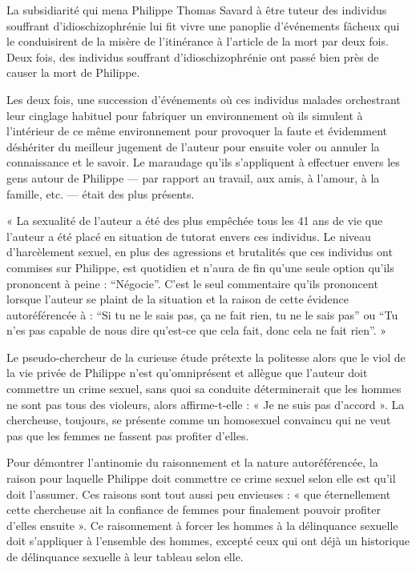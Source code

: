 \documentclass[12pt,oneside]{article}
\begin{document}
La subsidiarité qui mena Philippe Thomas Savard à être tuteur des individus souffrant d'idioschizophrénie lui fit vivre une panoplie d'événements fâcheux qui le conduisirent de la misère de l'itinérance à l'article de la mort par deux fois. Deux fois, des individus souffrant d'idioschizophrénie ont passé bien près de causer la mort de Philippe.

Les deux fois, une succession d'événements où ces individus malades orchestrant leur cinglage habituel pour fabriquer un environnement où ils simulent à l'intérieur de ce même environnement pour provoquer la faute et évidemment déshériter du meilleur jugement de l'auteur pour ensuite voler ou annuler la connaissance et le savoir. Le maraudage qu'ils s'appliquent à effectuer envers les gens autour de Philippe --- par rapport au travail, aux amis, à l'amour, à la famille, etc. --- était des plus présents.

« La sexualité de l'auteur a été des plus empêchée tous les 41 ans de vie que l'auteur a été placé en situation de tutorat envers ces individus. Le niveau d'harcèlement sexuel, en plus des agressions et brutalités que ces individus ont commises sur Philippe, est quotidien et n'aura de fin qu'une seule option qu'ils prononcent à peine : ``Négocie''. C'est le seul commentaire qu'ils prononcent lorsque l'auteur se plaint de la situation et la raison de cette évidence autoréférencée à : ``Si tu ne le sais pas, ça ne fait rien, tu ne le sais pas'' ou ``Tu n'es pas capable de nous dire qu'est-ce que cela fait, donc cela ne fait rien''. »

Le pseudo-chercheur de la curieuse étude prétexte la politesse alors que le viol de la vie privée de Philippe n'est qu'omniprésent et allègue que l'auteur doit commettre un crime sexuel, sans quoi sa conduite déterminerait que les hommes ne sont pas tous des violeurs, alors affirme-t-elle : « Je ne suis pas d'accord ». La chercheuse, toujours, se présente comme un homosexuel convaincu qui ne veut pas que les femmes ne fassent pas profiter d'elles.

Pour démontrer l'antinomie du raisonnement et la nature autoréférencée, la raison pour laquelle Philippe doit commettre ce crime sexuel selon elle est qu'il doit l'assumer. Ces raisons sont tout aussi peu envieuses : « que éternellement cette chercheuse ait la confiance de femmes pour finalement pouvoir profiter d'elles ensuite ». Ce raisonnement à forcer les hommes à la délinquance sexuelle doit s'appliquer à l'ensemble des hommes, excepté ceux qui ont déjà un historique de délinquance sexuelle à leur tableau selon elle.
\end{document}
